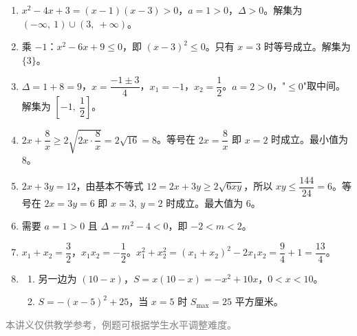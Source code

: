 \documentclass[12pt, a4paper]{ctexart}
\begin{document}
\vspace{1em}
\begin{knowledgebox}[参考答案]
\begin{enumerate}[label=\textbf{\arabic*.}, leftmargin=2em]
  \item $x^2 - 4x + 3 = (x-1)(x-3) > 0$，$a = 1 > 0$，$\Delta > 0$。解集为 $(-\infty,\ 1) \cup (3,\ +\infty)$。

  \item 乘 $-1$：$x^2 - 6x + 9 \leq 0$，即 $(x-3)^2 \leq 0$。只有 $x = 3$ 时等号成立。解集为 $\{3\}$。

  \item $\Delta = 1 + 8 = 9$，$x = \dfrac{-1 \pm 3}{4}$，$x_1 = -1$，$x_2 = \dfrac{1}{2}$。$a = 2 > 0$，"$\leq 0$"取中间。解集为 $\left[-1,\ \dfrac{1}{2}\right]$。

  \item $2x + \dfrac{8}{x} \geq 2\sqrt{2x \cdot \dfrac{8}{x}} = 2\sqrt{16} = 8$。等号在 $2x = \dfrac{8}{x}$ 即 $x = 2$ 时成立。最小值为 $8$。

  \item $2x + 3y = 12$，由基本不等式 $12 = 2x + 3y \geq 2\sqrt{6xy}$，所以 $xy \leq \dfrac{144}{24} = 6$。等号在 $2x = 3y = 6$ 即 $x = 3,\ y = 2$ 时成立。最大值为 $6$。

  \item 需要 $a = 1 > 0$ 且 $\Delta = m^2 - 4 < 0$，即 $-2 < m < 2$。

  \item $x_1 + x_2 = \dfrac{3}{2}$，$x_1 x_2 = -\dfrac{1}{2}$。$x_1^2 + x_2^2 = (x_1 + x_2)^2 - 2x_1 x_2 = \dfrac{9}{4} + 1 = \dfrac{13}{4}$。

  \item \begin{enumerate}[label=(\alph*)]
    \item 另一边为 $(10 - x)$，$S = x(10 - x) = -x^2 + 10x$，$0 < x < 10$。
    \item $S = -(x-5)^2 + 25$，当 $x = 5$ 时 $S_{\max} = 25$ 平方厘米。
  \end{enumerate}
\end{enumerate}
\end{knowledgebox}

\vfill
\begin{center}
\small\textcolor{gray}{本讲义仅供教学参考，例题可根据学生水平调整难度。}
\end{center}
\end{document}

